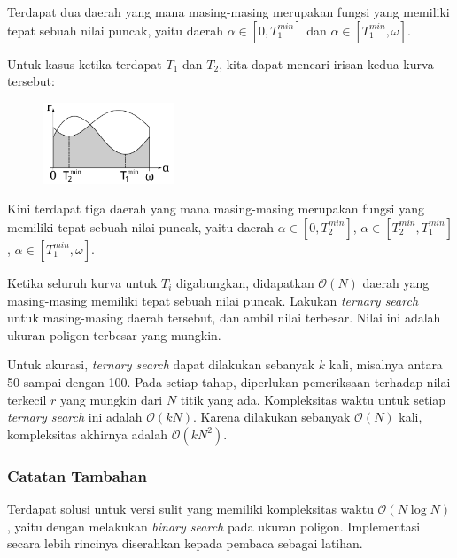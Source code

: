 \documentclass[../main_editorial.tex]{subfiles} %
\newcommand{\bigO}[1]{\mathcal{O}(#1)}
\begin{document}
Terdapat dua daerah yang mana masing-masing merupakan fungsi yang memiliki tepat sebuah nilai puncak, yaitu daerah $\alpha \in [0, T_1^{min}]$ dan $\alpha \in [T_1^{min}, \omega]$.

Untuk kasus ketika terdapat $T_1$ dan $T_2$, kita dapat mencari irisan kedua kurva tersebut:

\begin{figure}[!h]
	\centering
	\includegraphics[width=0.35\textwidth]{balon/asset/hard-chart2.pdf}
\end{figure}

Kini terdapat tiga daerah yang mana masing-masing merupakan fungsi yang memiliki tepat sebuah nilai puncak, yaitu daerah $\alpha \in [0, T_2^{min}]$, $\alpha \in [T_2^{min}, T_1^{min}]$, $\alpha \in [T_1^{min}, \omega]$.

Ketika seluruh kurva untuk $T_i$ digabungkan, didapatkan $\bigO{N}$ daerah yang masing-masing memiliki tepat sebuah nilai puncak. Lakukan \textit{ternary search} untuk masing-masing daerah tersebut, dan ambil nilai terbesar. Nilai ini adalah ukuran poligon terbesar yang mungkin.

Untuk akurasi, \textit{ternary search} dapat dilakukan sebanyak $k$ kali, misalnya antara 50 sampai dengan 100. Pada setiap tahap, diperlukan pemeriksaan terhadap nilai terkecil $r$ yang mungkin dari $N$ titik yang ada. Kompleksitas waktu untuk setiap \textit{ternary search} ini adalah $\bigO{kN}$. Karena dilakukan sebanyak $\bigO{N}$ kali, kompleksitas akhirnya adalah  $\bigO{kN^2}$.


\subsubsection*{Catatan Tambahan}

Terdapat solusi untuk versi sulit yang memiliki kompleksitas waktu $\bigO{N \log{N}}$, yaitu dengan melakukan \textit{binary search} pada ukuran poligon. Implementasi secara lebih rincinya diserahkan kepada pembaca sebagai latihan. 
\end{document}
